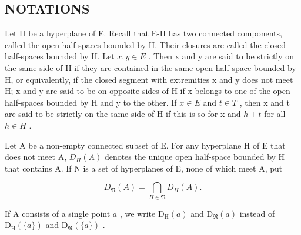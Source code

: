 \subsection{NOTATIONS}

Let H be a hyperplane of E. Recall that E-H has two connected components, called the open half-spaces bounded by H. Their closures are called the closed half-spaces bounded by H. Let \(x, y \in E\) . Then x and y are said to be strictly on the same side of H if they are contained in the same open half-space bounded by H, or equivalently, if the closed segment with extremities x and y does not meet H; x and y are said to be on opposite sides of H if x belongs to one of the open half-spaces bounded by H and y to the other. If \(x \in E\) and \(t \in T\) , then x and t are said to be strictly on the same side of H if this is so for x and \(h + t\) for all \(h \in H\) .

Let A be a non-empty connected subset of E. For any hyperplane H of E that does not meet A, \(D_{H}(A)\) denotes the unique open half-space bounded by H that contains A. If N is a set of hyperplanes of E, none of which meet A, put

\[
D _ {\mathfrak {N}} (A) = \bigcap_ {H \in \mathfrak {N}} D _ {H} (A).\tag{1}
\]

If \(\mathrm{A}\) consists of a single point \(a\) , we write \(\mathrm{D_H}(a)\) and \(\mathrm{D}_{\mathfrak{N}}(a)\) instead of \(\mathrm{D_H}(\{a\})\) and \(\mathrm{D}_{\mathfrak{N}}(\{a\})\) .

